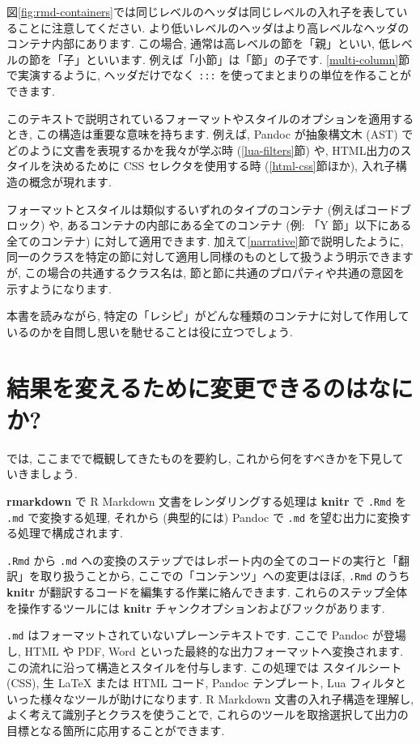 \documentclass[
  11pt,
  lualatex,ja=standard,jafont=noto]{bxjsreport}
\begin{document}
図\ref{fig:rmd-containers}では同じレベルのヘッダは同じレベルの入れ子を表していることに注意してください. より低いレベルのヘッダはより高レベルなヘッダのコンテナ内部にあります. この場合, 通常は高レベルの節を「親」といい, 低レベルの節を「子」といいます. 例えば「小節」は「節」の子です. \ref{multi-column}節で実演するように, ヘッダだけでなく \texttt{:::} を使ってまとまりの単位を作ることができます.

このテキストで説明されているフォーマットやスタイルのオプションを適用するとき, この構造は重要な意味を持ちます. 例えば, Pandoc が抽象構文木 (AST) でどのように文書を表現するかを我々が学ぶ時 (\ref{lua-filters}節) や, HTML出力のスタイルを決めるために CSS セレクタを使用する時 (\ref{html-css}節ほか), 入れ子構造の概念が現れます.

フォーマットとスタイルは類似するいずれのタイプのコンテナ (例えばコードブロック) や, あるコンテナの内部にある全てのコンテナ (例: 「Y 節」以下にある全てのコンテナ) に対して適用できます. 加えて\ref{narrative}節で説明したように, 同一のクラスを特定の節に対して適用し同様のものとして扱うよう明示できますが, この場合の共通するクラス名は, 節と節に共通のプロパティや共通の意図を示すようになります.

本書を読みながら, 特定の「レシピ」がどんな種類のコンテナに対して作用しているのかを自問し思いを馳せることは役に立つでしょう.

\hypertarget{what-to-change}{%
\section{結果を変えるために変更できるのはなにか?}\label{what-to-change}}

では, ここまでで概観してきたものを要約し, これから何をすべきかを下見していきましょう.

\textbf{rmarkdown} で R Markdown 文書をレンダリングする処理は \textbf{knitr} で \texttt{.Rmd} を \texttt{.md} で変換する処理, それから (典型的には) Pandoc で \texttt{.md} を望む出力に変換する処理で構成されます.

\texttt{.Rmd} から \texttt{.md} への変換のステップではレポート内の全てのコードの実行と「翻訳」を取り扱うことから, ここでの「コンテンツ」への変更はほぼ, \texttt{.Rmd} のうち \textbf{knitr} が翻訳するコードを編集する作業に絡んできます. これらのステップ全体を操作するツールには \textbf{knitr} チャンクオプションおよびフックがあります.

\texttt{.md} はフォーマットされていないプレーンテキストです. ここで Pandoc が登場し, HTML や PDF, Word といった最終的な出力フォーマットへ変換されます. この流れに沿って構造とスタイルを付与します. この処理では スタイルシート (CSS), 生 LaTeX または HTML コード, Pandoc テンプレート, Lua フィルタといった様々なツールが助けになります. R Markdown 文書の入れ子構造を理解し, よく考えて識別子とクラスを使うことで, これらのツールを取捨選択して出力の目標となる箇所に応用することができます.
\end{document}
